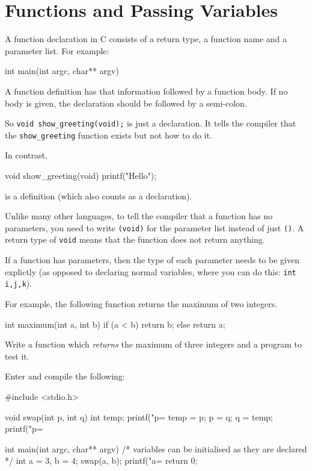 
\chapter{Functions and Passing Variables}

A function declaration in C consists of a return type, a function name and a parameter list.
For example:
\begin{codeinline}
int main(int argc, char** argv)
\end{codeinline}
A function definition has that information followed by a function body. 
If no body is given, the declaration should be followed by a semi-colon.

So \lstinline!void show_greeting(void);!  is just a declaration.
It tells the compiler that the \texttt{show\_greeting} function exists but not how to do it.

In contrast,
\begin{codeinline}
void show_greeting(void) {
    printf("Hello\n");
}
\end{codeinline}

\noindent is a definition (which also counts as a declaration).

Unlike many other languages, to tell the compiler that a function has no parameters, you 
need to write \lstinline!(void)! for the parameter list instead of just \lstinline!()!.
A return type of \lstinline!void! means that the function does not return anything.

If a function has parameters, then the type of each parameter needs to be given explictly (as
opposed to declaring normal variables, where you can do this: \lstinline!int i,j,k!).

For example, the following function returns the maximum of two integers.
\begin{codeblock}
int maximum(int a, int b) {
    if (a < b) {
        return b;
    } else {
        return a;
    }
}
\end{codeblock}

\begin{exercise}
Write a function which \emph{returns} the maximum of three integers and a program to test it. 
\end{exercise}


Enter and compile the following:
\begin{codeblock}
#include <stdio.h>

void swap(int p, int q) {
    int temp;
    printf("p=%
    temp = p;
    p = q;
    q = temp;
    printf("p=%
}

int main(int argc, char** argv) {
    /* variables can be initialised as they are declared */
    int a = 3, b = 4;
    swap(a, b);
    printf("a=%
    return 0;
}
\end{codeblock}

